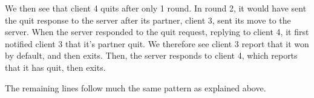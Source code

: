 \documentclass[titlepage]{article}
\begin{document}
We then see that client 4 quits after only 1 round.
In round 2, it would have sent the quit response to the server after its partner, client 3,
sent its move to the server.
When the server responded to the quit request, replying to client 4, it first notified client 3
that it's partner quit.
We therefore see client 3 report that it won by default, and then exits.
Then, the server responds to client 4, which reports that it has quit, then exits.

The remaining lines follow much the same pattern as explained above.
\end{document}
